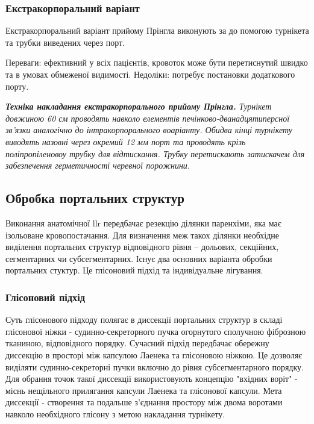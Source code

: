 \begin{refsection}
\subsubsection{Екстракорпоральний варіант}

Екстракорпоральний варіант прийому Прінгла виконують за до помогою турнікета та трубки виведених через порт.

Переваги: ефективний у всіх пацієнтів, кровоток може бути перетиснутий швидко та в умовах обмеженої видимості.
Недоліки: потребує постановки додаткового порту.

\textit{ \textbf{Техніка накладання екстракорпорального прийому Прінгла.} Турнікет довжиною 60 см проводять навколо елементів печінково-дванадцятиперсної зв'язки аналогічно до інтракорпорального воаріанту. Обидва кінці турнікету виводять назовні через окремий 12 мм порт та проводять крізь поліпропіленовоу трубку для відтискання. Трубку перетискають затискачем для забезпечення герметичності черевної порожнини.}


\subsection{Обробка портальних структур}

Виконання анатомічної \acrshort{llr} передбачає резекцію ділянки паренхіми, яка має ізольоване кровопостачання. Для визначення меж такох ділянки необхідне виділення портальних структур відповідного рівня -- дольових, секційних, сегментарних чи субсегментарних. Існує два основних варіанта обробки портальних стуктур. Це глісоновий підхід та індивідуальне лігування.

\subsubsection{Глісоновий підхід}

Суть глісонового підходу полягає в диссекції портальних структур в складі глісонової ніжки - судинно-секреторного пучка огорнутого сполучною фіброзною тканиною, відповідного порядку. Сучасний підхід передбачає обережну диссекцію в просторі між капсулою Лаенека та глісоновою ніжкою. Це дозволяє виділяти судинно-секреторні пучки включно до рівня субсегментарного порядку. Для обрання точок такої диссекції використовують концепцію "вхідних воріт" - міснь нещільного прилягання капсули Лаенека та глісонової капсули. Мета диссекції - створення та подальше з'єднання простору між двома воротами навколо необхідного глісону з метою накладання турнікету.


\end{refsection}
